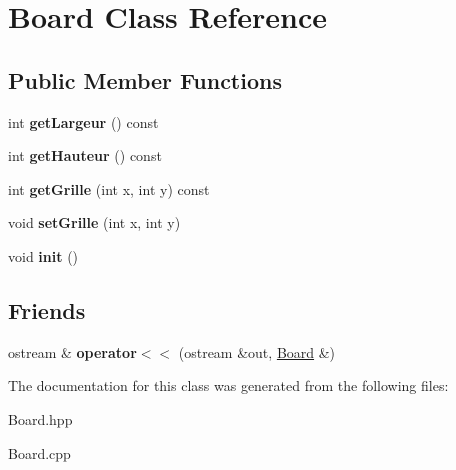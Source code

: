 \hypertarget{class_board}{}\section{Board Class Reference}
\label{class_board}
\subsection*{Public Member Functions}
\begin{DoxyCompactItemize}
\item 
\mbox{\label{class_board_ac7cfff6987702708f85280af70e6c7b4}} 
int {\bfseries get\+Largeur} () const
\item 
\mbox{\label{class_board_af69f2b14974e2c6b7fcffa3fef58340f}} 
int {\bfseries get\+Hauteur} () const
\item 
\mbox{\label{class_board_aea48e2901225f0fae6af38096fb16ef8}} 
int {\bfseries get\+Grille} (int x, int y) const
\item 
\mbox{\label{class_board_a7c06f0c081a6a037fa65204a7a9badd2}} 
void {\bfseries set\+Grille} (int x, int y)
\item 
\mbox{\label{class_board_a2cf5d799795f86a50d5d6eb4bd353b93}} 
void {\bfseries init} ()
\end{DoxyCompactItemize}
\subsection*{Friends}
\begin{DoxyCompactItemize}
\item 
\mbox{\label{class_board_ad3e5ca5550a8da6e64c7fa5f50615862}} 
ostream \& {\bfseries operator$<$$<$} (ostream \&out, \hyperlink{class_board}{Board} \&)
\end{DoxyCompactItemize}


The documentation for this class was generated from the following files\+:\begin{DoxyCompactItemize}
\item 
Board.\+hpp\item 
Board.\+cpp\end{DoxyCompactItemize}

